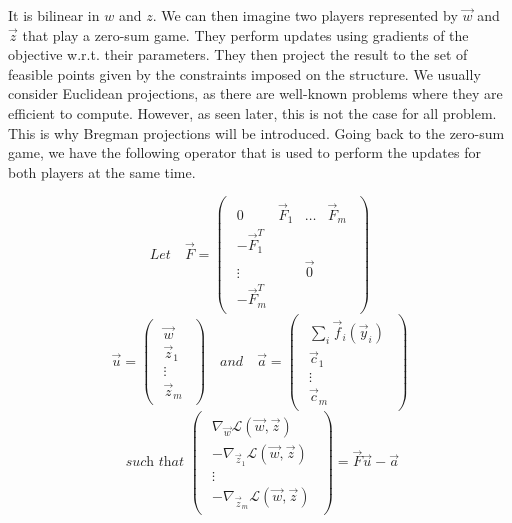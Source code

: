 It is bilinear in $w$ and $z$. We can then imagine two players represented by
$\vec w$ and $\vec z$ that play a zero-sum game. They perform updates using gradients of
the objective w.r.t. their parameters. They then project the result to the set
of feasible points given by the constraints imposed on the structure. We usually
consider Euclidean projections, as there are well-known problems where they are
efficient to compute. However, as seen later, this is not the case for all
problem. This is why Bregman projections will be introduced. Going back to the
zero-sum game, we have the following operator that is used to perform the
updates for both players at the same time.

\begin{equation*}
 \textit{Let}\quad\vec F= \begin{pmatrix}
 \begin{array}{cccc}
    0 & \vec F_1 & \dots & \vec F_m\\
    -\vec F_1^T & & &\\
    \vdots & & \vec 0 &\\
    -\vec F_m^T & & &
 \end{array}
\end{pmatrix}
\end{equation*}
\begin{equation*}
 \vec u= \begin{pmatrix}
      \begin{array}{c}
        \vec w\\
        \vec z_1\\
        \vdots\\
        \vec z_m
      \end{array}
    \end{pmatrix}\quad\textit{and}\quad
 \vec a=  \begin{pmatrix}
      \begin{array}{c}
        \sum_i \vec f_i(\vec y_i)\\
        \vec c_1\\
        \vdots\\
        \vec c_m
      \end{array}
    \end{pmatrix}
\end{equation*}
\begin{equation*}
 \textit{ such that }\begin{pmatrix}
    \begin{array}{c}
      \nabla_{\vec w} \mathcal{L}(\vec w,\vec z)\\
      -\nabla_{\vec z_1} \mathcal{L}(\vec w,\vec z)\\
      \vdots\\
      -\nabla_{\vec z_m} \mathcal{L}(\vec w,\vec z)
    \end{array}
  \end{pmatrix} = \vec F \vec u - \vec a
\end{equation*}


